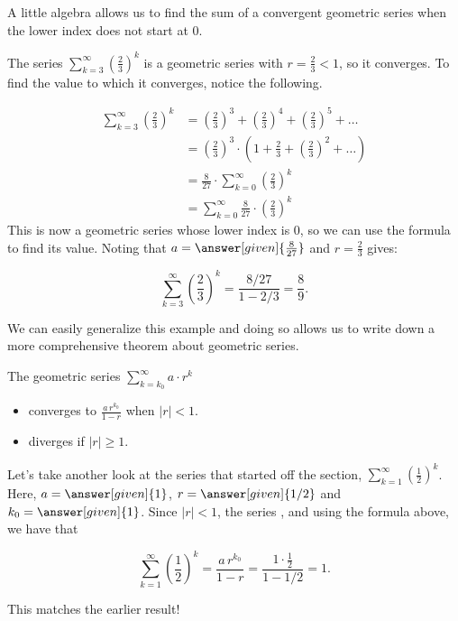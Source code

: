 \documentclass{ximera}
\begin{document}
A little algebra allows us to find the sum of a convergent geometric series when the lower index does not start at $0$.  

\begin{example}
The series $\sum\limits_{k=3}^{\infty} \left(\frac{2}{3}\right)^k$ is a geometric series with $r=\frac{2}{3}<1$, so it converges.  To find the value to which it converges, notice the following.

\begin{align*}
\sum\limits_{k=3}^{\infty} \left(\frac{2}{3}\right)^k &=  \left(\frac{2}{3}\right)^3+ \left(\frac{2}{3}\right)^4+ \left(\frac{2}{3}\right)^5+\ldots \\
&= \left(\frac{2}{3}\right)^3 \cdot \left(1+ \frac{2}{3}+ \left(\frac{2}{3}\right)^2+\ldots\right) \\
&= \frac{8}{27}  \cdot  \sum_{k=0}^{\infty}\left(\frac{2}{3}\right)^k \\
&= \sum\limits_{k=0}^{\infty} \frac{8}{27}  \cdot \left(\frac{2}{3}\right)^k
\end{align*}
This is now a geometric series whose lower index is $0$, so we can use the formula to find its value. Noting that $a=\answer[given]{ \frac{8}{27} }$ and $r= \frac{2}{3}$ gives:

\[
\sum\limits_{k=3}^{\infty} \left(\frac{2}{3}\right)^k = \frac{8/27}{1-2/3} = \frac{8}{9}.
\]
\end{example}

We can easily generalize this example and doing so allows us to write down a more comprehensive theorem about geometric series.

\begin{theorem}
  The geometric series $\sum\limits_{k= k_0}^\infty a \cdot r^k$ 
  
  \begin{itemize} 
  \item converges to $\frac{a \, r^{k_0}}{1-r}$ when $|r| < 1$.
  \item diverges if $|r| \geq 1$.  
  \end{itemize}
  \end{theorem}
 
\begin{example}
Let's take another look at the series that started off the section, $\sum\limits_{k=1}^{\infty} \left(\frac{1}{2}\right)^k$.  Here, $a=\answer[given]{1}$, $r=\answer[given]{1/2}$ and $k_0 = \answer[given]{1}$.  Since $|r|<1$, the series , and using the formula above, we have that

\[ \sum\limits_{k=1}^{\infty} \left(\frac{1}{2}\right)^k = \frac{a \, r^{k_0}}{1-r} = \frac{1\cdot \frac{1}{2}}{1-1/2} =1.\]

This matches the earlier result!  
\end{example}
\end{document}
